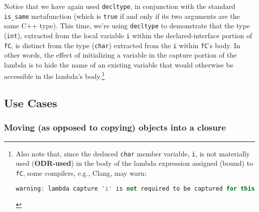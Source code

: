 \noindent Notice that we have again used \texttt{decltype}, in conjunction with
the standard \texttt{is\_same} metafunction (which is \texttt{true} if
and only if its two arguments are the same C++ type). This time, we're using \texttt{decltype} to
demonstrate that the type (\texttt{int}), extracted from the local
variable \texttt{i} within the declared-interface portion of
\texttt{fC}, is distinct from the type (\texttt{char}) extracted from
the \texttt{i} within \texttt{fC}'s body. In other words, the effect
of initializing a variable in the capture portion of the lambda is to
hide the name of an existing variable that would otherwise be accessible
in the lambda's body.{\cprotect\footnote{Also note that, since the
deduced \texttt{char} member variable, \texttt{i}, is not materially
used (\textbf{ODR-used}) in the body of the lambda expression assigned
(bound) to \texttt{fC}, some compilers, e.g., Clang, may warn:

\begin{lstlisting}[language=C++, basicstyle={\ttfamily\footnotesize}]
warning: lambda capture 'i' is not required to be captured for this use
\end{lstlisting}
}}

\subsection[Use Cases]{Use Cases}\label{use-cases-lambdacapture}

\subsubsection[Moving (as opposed to copying) objects into a closure]{Moving (as opposed to copying) objects into a closure}\label{moving-(as-opposed-to-copying)-objects-into-a-closure}

